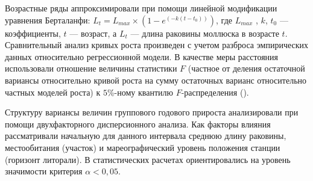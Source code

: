 Возрастные ряды аппроксимировали при помощи линейной модификации уравнения Берталанфи: $L_{t} = L_{max} \times (1 - e^{(-k(t - t_{0}))})$, где $L_{max}$ , $k$, $t_{0}$ --- коэффициенты, $t$ --- возраст, а $L_{t}$ --- длина раковины моллюска в возрасте $t$.
Сравнительный анализ кривых роста произведен с учетом разброса эмпирических данных относительно регрессионной модели. 
В качестве меры расстояния использовали отношение величины статистики $F$ (частное от деления остаточной вариансы относительно кривой роста на сумму остаточных варианс относительно частных моделей роста) к $5$\%-ному квантилю $F$-распределения (\cite{Maximovich_1989}).

Структуру вариансы величин группового годового прироста анализировали при помощи двухфакторного дисперсионного анализа. 
Как факторы влияния рассматривали начальную для данного интервала среднюю длину раковины, местообитания (участок) и мареографический уровень положения станции (горизонт литорали). 
В статистических расчетах ориентировались на уровень значимости критерия $\alpha < 0,05$.

